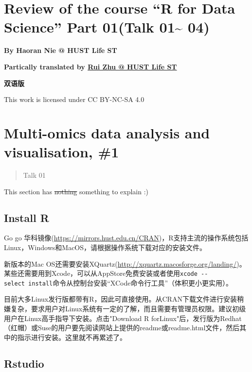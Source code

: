 \documentclass[
]{article}
\author{}
\date{}
\begin{document}
\hypertarget{review-of-the-course-r-for-data-science-part-01talk-01-04}{%
\section{Review of the course ``R for Data Science'' Part 01(Talk
01\textasciitilde{}
04)}\label{review-of-the-course-r-for-data-science-part-01talk-01-04}}

\textbf{By Haoran Nie @ HUST Life ST}

\textbf{Partically translated by
\href{https://github.com/1508324011}{Rui Zhu @ HUST Life ST}}

\textbf{双语版}

This work is licensed under CC BY-NC-SA 4.0

\hypertarget{multi-omics-data-analysis-and-visualisation-1}{%
\section{Multi-omics data analysis and visualisation,
\#1}\label{multi-omics-data-analysis-and-visualisation-1}}

\begin{quote}
Talk 01
\end{quote}

This section has \st{nothing} something to explain :)

\hypertarget{install-r}{%
\subsection{Install R}\label{install-r}}

Go go
{华科镜像}(\url{https://mirrors.hust.edu.cn/CRAN})，R支持主流的操作系统包括Linux，Windows和MacOS，请根据操作系统下载对应的安装文件。

新版本的Mac
OS还需要安装XQuartz(\url{http://xquartz.macosforge.org/landing/})。某些还需要用到Xcode，可以从AppStore免费安装或者使用\texttt{xcode\ -\/-select\ install}命令从控制台安装``XCode命令行工具''（体积更小更实用）。

目前大多Linux发行版都带有R，因此可直接使用。从CRAN下载文件进行安装稍嫌复杂，要求用户对Linux系统有一定的了解，而且需要有管理员权限。建议初级用户在Linux高手指导下安装。点击"Download
R
forLinux"后，发行版为Redhat（红帽）或Suse的用户要先阅读网站上提供的readme或readme.html文件，然后其中的指示进行安装。这里就不再累述了。

\hypertarget{r-studio}{%
\subsection{Rstudio}\label{r-studio}}
\end{document}

